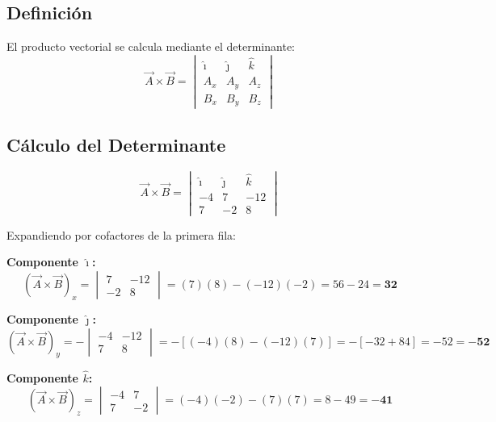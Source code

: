 \documentclass[12pt,letterpaper]{article}
\begin{document}
\subsection*{Definici\'on}

El producto vectorial se calcula mediante el determinante:
\begin{equation*}
\vec{A} \times \vec{B} = \begin{vmatrix}
\hat{\imath} & \hat{\jmath} & \hat{k} \\
A_x & A_y & A_z \\
B_x & B_y & B_z
\end{vmatrix}
\end{equation*}

\subsection*{C\'alculo del Determinante}

\begin{equation*}
\vec{A} \times \vec{B} = \begin{vmatrix}
\hat{\imath} & \hat{\jmath} & \hat{k} \\
-4 & 7 & -12 \\
7 & -2 & 8
\end{vmatrix}
\end{equation*}

Expandiendo por cofactores de la primera fila:

\textbf{Componente $\hat{\imath}$:}
\begin{equation*}
(\vec{A} \times \vec{B})_x = \begin{vmatrix} 7 & -12 \\ -2 & 8 \end{vmatrix} = (7)(8) - (-12)(-2) = 56 - 24 = \mathbf{32}
\end{equation*}

\textbf{Componente $\hat{\jmath}$:}
\begin{equation*}
(\vec{A} \times \vec{B})_y = -\begin{vmatrix} -4 & -12 \\ 7 & 8 \end{vmatrix} = -[(-4)(8) - (-12)(7)] = -[-32 + 84] = -52 = \mathbf{-52}
\end{equation*}

\textbf{Componente $\hat{k}$:}
\begin{equation*}
(\vec{A} \times \vec{B})_z = \begin{vmatrix} -4 & 7 \\ 7 & -2 \end{vmatrix} = (-4)(-2) - (7)(7) = 8 - 49 = \mathbf{-41}
\end{equation*}
\end{document}
